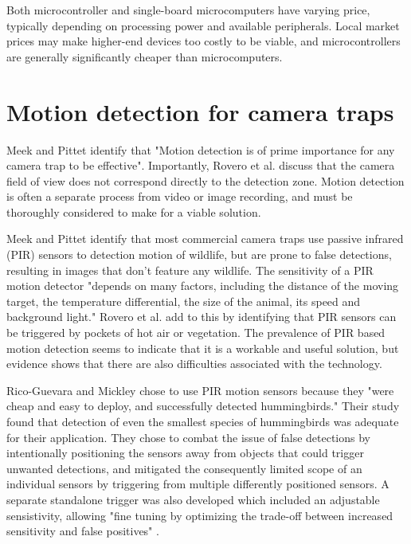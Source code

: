 \documentclass[class=report,11pt,crop=false]{standalone}
\begin{document}
Both microcontroller and single-board microcomputers have varying price, typically depending on processing power and available peripherals. Local market prices may make higher-end devices too costly to be viable, and microcontrollers are generally significantly cheaper than microcomputers.

\section{Motion detection for camera traps}

Meek and Pittet \cite{meek2012user} identify that "Motion detection is of prime importance for any camera trap to be effective". Importantly, Rovero et al. \cite{rovero2013which} discuss that the camera field of view does not correspond directly to the detection zone. Motion detection is often a separate process from video or image recording, and must be thoroughly considered to make for a viable solution.

Meek and Pittet \cite{meek2012user} identify that most commercial camera traps use passive infrared (PIR) sensors to detection motion of wildlife, but are prone to false detections, resulting in images that don't feature any wildlife. The sensitivity of a PIR motion detector "depends on many factors, including the distance of the moving target, the temperature differential, the size of the animal, its speed and background light." Rovero et al. \cite{rovero2013which} add to this by identifying that PIR sensors can be triggered by pockets of hot air or vegetation. The prevalence of PIR based motion detection seems to indicate that it is a workable and useful solution, but evidence shows that there are also difficulties associated with the technology.

Rico-Guevara and Mickley \cite{rico-guevara2017bring} chose to use PIR motion sensors because they "were cheap and easy to deploy, and successfully detected hummingbirds." Their study found that detection of even the smallest species of hummingbirds was adequate for their application. They chose to combat the issue of false detections by intentionally positioning the sensors away from objects that could trigger unwanted detections, and mitigated the consequently limited scope of an individual sensors by triggering from multiple differently positioned sensors. A separate standalone trigger was also developed which included an adjustable sensistivity, allowing "fine tuning by optimizing the trade-off between increased sensitivity and false positives" \cite{rico-guevara2017bring}.
\end{document}
